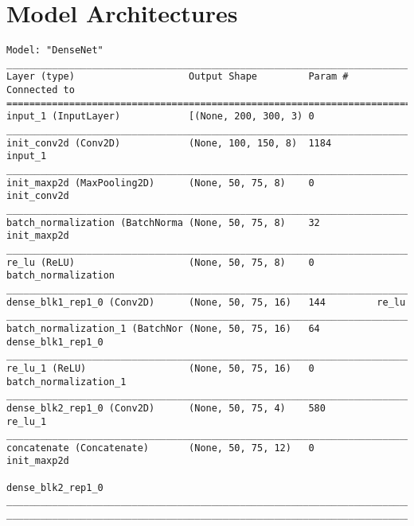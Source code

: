\chapter{Model Architectures}

\scriptsize
\begin{verbatim}
Model: "DenseNet" 
__________________________________________________________________________________________
Layer (type)                    Output Shape         Param #     Connected to                     
==========================================================================================
input_1 (InputLayer)            [(None, 200, 300, 3) 0                                            
__________________________________________________________________________________________
init_conv2d (Conv2D)            (None, 100, 150, 8)  1184        input_1                    
__________________________________________________________________________________________
init_maxp2d (MaxPooling2D)      (None, 50, 75, 8)    0           init_conv2d                
__________________________________________________________________________________________
batch_normalization (BatchNorma (None, 50, 75, 8)    32          init_maxp2d                
__________________________________________________________________________________________
re_lu (ReLU)                    (None, 50, 75, 8)    0           batch_normalization
__________________________________________________________________________________________
dense_blk1_rep1_0 (Conv2D)      (None, 50, 75, 16)   144         re_lu                      
__________________________________________________________________________________________
batch_normalization_1 (BatchNor (None, 50, 75, 16)   64          dense_blk1_rep1_0          
__________________________________________________________________________________________
re_lu_1 (ReLU)                  (None, 50, 75, 16)   0           batch_normalization_1      
__________________________________________________________________________________________
dense_blk2_rep1_0 (Conv2D)      (None, 50, 75, 4)    580         re_lu_1                    
__________________________________________________________________________________________
concatenate (Concatenate)       (None, 50, 75, 12)   0           init_maxp2d                
                                                                 dense_blk2_rep1_0          
__________________________________________________________________________________________
__________________________________________________________________________________________

\end{verbatim}

